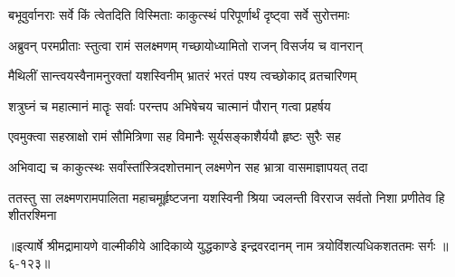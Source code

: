 \twolineshloka
{बभूवुर्वानराः सर्वे किं त्वेतदिति विस्मिताः}
{काकुत्स्थं परिपूर्णार्थं दृष्ट्वा सर्वे सुरोत्तमाः} %

\twolineshloka
{अब्रुवन् परमप्रीताः स्तुत्वा रामं सलक्ष्मणम्}
{गच्छायोध्यामितो राजन् विसर्जय च वानरान्} %

\twolineshloka
{मैथिलीं सान्त्वयस्वैनामनुरक्तां यशस्विनीम्}
{भ्रातरं भरतं पश्य त्वच्छोकाद् व्रतचारिणम्} %

\twolineshloka
{शत्रुघ्नं च महात्मानं मातॄः सर्वाः परन्तप}
{अभिषेचय चात्मानं पौरान् गत्वा प्रहर्षय} %

\twolineshloka
{एवमुक्त्वा सहस्राक्षो रामं सौमित्रिणा सह}
{विमानैः सूर्यसङ्काशैर्ययौ हृष्टः सुरैः सह} %

\twolineshloka
{अभिवाद्य च काकुत्स्थः सर्वांस्तांस्त्रिदशोत्तमान्}
{लक्ष्मणेन सह भ्रात्रा वासमाज्ञापयत् तदा} %

\twolineshloka
{ततस्तु सा लक्ष्मणरामपालिता महाचमूर्हृष्टजना यशस्विनी}
{श्रिया ज्वलन्ती विरराज सर्वतो निशा प्रणीतेव हि शीतरश्मिना} %


॥इत्यार्षे श्रीमद्रामायणे वाल्मीकीये आदिकाव्ये युद्धकाण्डे इन्द्रवरदानम् नाम त्रयोविंशत्यधिकशततमः सर्गः ॥६-१२३॥
